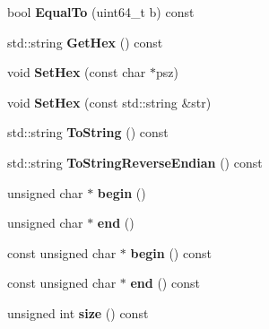 \begin{DoxyCompactItemize}
\item 
\mbox{\label{classbase__uint_aaba2c27863f6d5077ed21cd353766168}} 
bool {\bfseries Equal\+To} (uint64\+\_\+t b) const
\item 
\mbox{\label{classbase__uint_ae5e7b7481de91ebead20eebd5d685441}} 
std\+::string {\bfseries Get\+Hex} () const
\item 
\mbox{\label{classbase__uint_ade1a897fac931f28f54998c92c797228}} 
void {\bfseries Set\+Hex} (const char $\ast$psz)
\item 
\mbox{\label{classbase__uint_afe3600e6ae4e9f69e1c036581a2716c8}} 
void {\bfseries Set\+Hex} (const std\+::string \&str)
\item 
\mbox{\label{classbase__uint_acccba4d9d51a0c36261718ca0cbb293b}} 
std\+::string {\bfseries To\+String} () const
\item 
\mbox{\label{classbase__uint_a96b6a5dd04d4b8282eabec650b96ca9a}} 
std\+::string {\bfseries To\+String\+Reverse\+Endian} () const
\item 
\mbox{\label{classbase__uint_aaa32054bf4e8fbb31d54a75f6065174d}} 
unsigned char $\ast$ {\bfseries begin} ()
\item 
\mbox{\label{classbase__uint_a76539ef6be800bc02e4038f457a4f74a}} 
unsigned char $\ast$ {\bfseries end} ()
\item 
\mbox{\label{classbase__uint_a41237a3bb063583fa001e96f654fbb19}} 
const unsigned char $\ast$ {\bfseries begin} () const
\item 
\mbox{\label{classbase__uint_a205d89f7614095c6c8badb1e3dfa0f0f}} 
const unsigned char $\ast$ {\bfseries end} () const
\item 
\mbox{\label{classbase__uint_a1f49b034e686269601ea89b0319b8004}} 
unsigned int {\bfseries size} () const
\item 
\mbox{\label{classbase__uint_aae5336be1799bd2debf74efb1d2cc542}} 

\end{DoxyCompactItemize}
